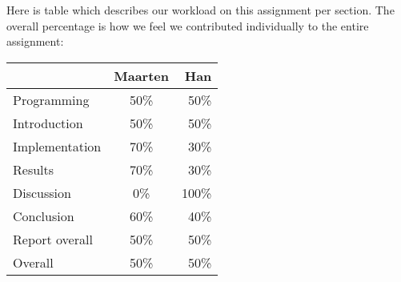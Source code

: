 Here is table which describes our workload on this assignment per section. The overall percentage is how we feel we contributed individually to the entire assignment:

\begin{tabular}{ l | c | r }
    & Maarten & Han \\ \hline
  Programming & 50\% & 50\% \\
  \hline
  Introduction & 50\% & 50\% \\
  Implementation & 70\% & 30\% \\
  Results & 70\% & 30\% \\
  Discussion & 0\% & 100\% \\
  Conclusion & 60\% & 40\% \\
  \hline
  Report overall & 50\% & 50\% \\ \hline \hline
  Overall & 50\% & 50\%
\end{tabular}